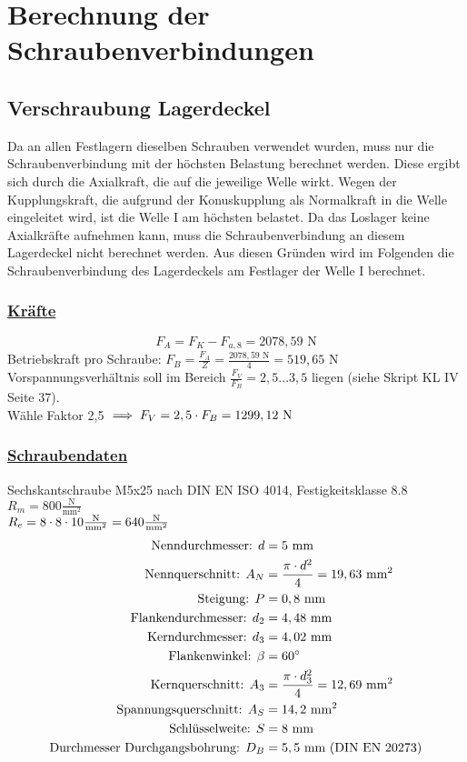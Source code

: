 \newpage
\section{Berechnung der Schraubenverbindungen}
\subsection{Verschraubung Lagerdeckel}
Da an allen Festlagern dieselben Schrauben verwendet wurden, muss nur die Schraubenverbindung mit der höchsten Belastung berechnet werden. Diese ergibt sich durch die Axialkraft, die auf die jeweilige Welle wirkt. Wegen der Kupplungskraft, die aufgrund der Konuskupplung als Normalkraft in die Welle eingeleitet wird, ist die Welle I am höchsten belastet. Da das Loslager keine Axialkräfte aufnehmen kann, muss die Schraubenverbindung an diesem Lagerdeckel nicht berechnet werden. 
Aus diesen Gründen wird im Folgenden die Schraubenverbindung des Lagerdeckels am Festlager der Welle I berechnet.
\subsubsection{\underline{Kräfte}}
\[
	F_A = F_K - F_{a,8} = 2078,59 \text{ N}
\]
\flushleft
Betriebskraft pro Schraube: $F_B = \frac{F_A}{Z} = \frac{2078,59 \text{ N}}{4} = 519,65 \text{ N}$ \\
Vorspannungsverhältnis soll im Bereich $\frac{F_V}{F_B} = 2,5...3,5$ liegen (siehe Skript KL IV  Seite 37). \\
\vspace{.5cm}
Wähle Faktor 2,5 $\implies F_V = 2,5 \cdot F_B = 1299,12 \text{ N}$

\newpage
\subsubsection{\underline{Schraubendaten}}
Sechskantschraube M5x25 nach DIN EN ISO 4014, Festigkeitsklasse 8.8\\
$R_m = 800 \frac{\text{N}}{\text{mm}^2}$\\
$R_e = 8\cdot8\cdot10\frac{\text{N}}{\text{mm}^2} = 640 \frac{\text{N}}{\text{mm}^2}$\\
\begin{align*}
\text{Nenndurchmesser: } d &= 5\text{ mm}\\
\text{Nennquerschnitt: } A_N &= \frac{\pi\cdot d^2}{4} = 19,63\text{ mm}^2\\
\text{Steigung: } P &= 0,8\text{ mm}\\
\text{Flankendurchmesser: } d_2 &= 4,48\text{ mm}\\
\text{Kerndurchmesser: } d_3 &= 4,02 \text{ mm}\\
\text{Flankenwinkel: } \beta &= 60^{\circ}\\
\text{Kernquerschnitt: } A_3 &= \frac{\pi\cdot d_3^2}{4} = 12,69\text{ mm}^2\\
\text{Spannungsquerschnitt: } A_S &= 14,2 \text{ mm}^2\\
\text{Schlüsselweite: } S &= 8 \text{ mm}\\
\text{Durchmesser Durchgangsbohrung: } D_B &= 5,5 \text{ mm} \text{ (DIN EN 20273)}
\end{align*}
\newpage

